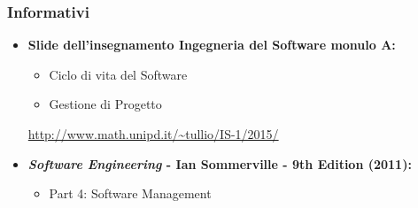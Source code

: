 \subsubsection{Informativi}
\begin{itemize}
	\item \textbf{Slide dell'insegnamento Ingegneria del Software monulo A:}
	\begin{itemize}
		\item Ciclo di vita del Software
		\item Gestione di Progetto
	\end{itemize}
	\url{http://www.math.unipd.it/~tullio/IS-1/2015/}
	\item \textbf{\textit{Software Engineering} - Ian Sommerville - 9th Edition (2011):}
	\begin{itemize}
		\item Part 4: Software Management
	\end{itemize} 
\end{itemize}